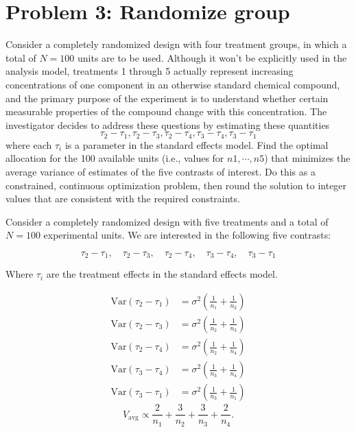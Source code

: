 \documentclass{article}
\begin{document}
\section*{Problem 3: Randomize group}
Consider a completely randomized design with four treatment groups, in which a total of $N = 100$
units are to be used. Although it won’t be explicitly used in the analysis model, treatments 1 through
5 actually represent increasing concentrations of one component in an otherwise standard chemical
compound, and the primary purpose of the experiment is to understand whether certain measurable
properties of the compound change with this concentration. The investigator decides to address these
questions by estimating these quantities
$$
	\tau_2 -\tau_1, \tau_2-\tau_3, \tau_2-\tau_4,\tau_3 - \tau_4, \tau_3-\tau_1
$$
where each $\tau_i$ is a parameter in the standard effects model. Find the optimal allocation for the 100
available units (i.e., values for $n1,\cdots, n5$) that minimizes the average variance of estimates of the five
contrasts of interest. Do this as a constrained, continuous optimization problem, then round the solution
to integer values that are consistent with the required constraints.

Consider a completely randomized design with five treatments and a total of $N = 100$ experimental units. We are interested in the following five contrasts:

\[
	\tau_2 -\tau_1, \quad \tau_2-\tau_3, \quad \tau_2-\tau_4, \quad \tau_3 - \tau_4, \quad \tau_3-\tau_1
\]

Where $\tau_i$ are the treatment effects in the standard effects model.


\[
	\begin{aligned}
		\mathrm{Var}(\tau_2-\tau_1) & = \sigma^2 \left( \frac{1}{n_1} + \frac{1}{n_2} \right) \\
		\mathrm{Var}(\tau_2-\tau_3) & = \sigma^2 \left( \frac{1}{n_2} + \frac{1}{n_3} \right) \\
		\mathrm{Var}(\tau_2-\tau_4) & = \sigma^2 \left( \frac{1}{n_2} + \frac{1}{n_4} \right) \\
		\mathrm{Var}(\tau_3-\tau_4) & = \sigma^2 \left( \frac{1}{n_3} + \frac{1}{n_4} \right) \\
		\mathrm{Var}(\tau_3-\tau_1) & = \sigma^2 \left( \frac{1}{n_3} + \frac{1}{n_1} \right)
	\end{aligned}
\]
\[
	V_{\text{avg}} \propto \frac{2}{n_1} + \frac{3}{n_2} + \frac{3}{n_3} + \frac{2}{n_4}.
\]
\end{document}
